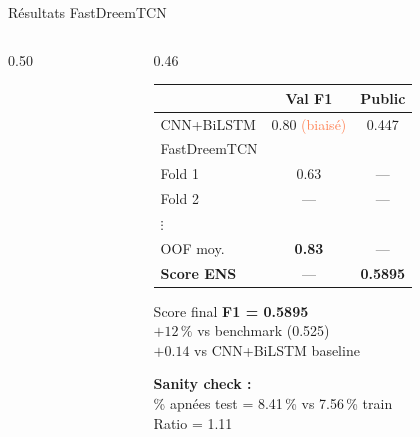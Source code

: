 \documentclass[aspectratio=169, 10pt]{beamer}
\begin{document}
\begin{frame}{Résultats FastDreemTCN}
    \begin{columns}[T]
        \begin{column}{0.50\textwidth}
        \end{column}
        \begin{column}{0.46\textwidth}
            \small
            \begin{tabular}{@{}lcc@{}}
                \toprule
                \textbf{} & \textbf{Val F1} & \textbf{Public} \\
                \midrule
                CNN+BiLSTM   & 0.80 \textcolor{Coral}{(biaisé)} & 0.447 \\
                \midrule
                FastDreemTCN & & \\
                \quad Fold 1 & 0.63 & --- \\
                \quad Fold 2 & --- & --- \\
                \quad $\vdots$ & & \\
                \quad OOF moy. & \textbf{0.83} & --- \\
                \midrule
                \textbf{Score ENS} & --- & \textbf{0.5895} \\
                \bottomrule
            \end{tabular}
            \vspace{0.2cm}
            \begin{alertblock}{\centering\small Score final}
                \centering\normalsize\textbf{F1 = 0.5895}\\
                \small $+12\,\%$ vs benchmark (0.525)\\
                $+0.14$ vs CNN+BiLSTM baseline
            \end{alertblock}
            \vspace{0.1cm}
            \small\textbf{Sanity check :}\\
            \% apnées test = 8.41\,\% vs 7.56\,\% train\\
            Ratio = 1.11 \textcolor{Teal}{\checkmark}
        \end{column}
    \end{columns}
\end{frame}
\end{document}
